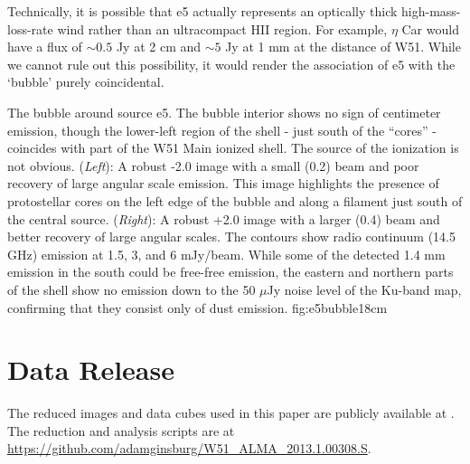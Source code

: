 \documentclass[twocolumn]{aastex61}
\begin{document}
Technically, it is possible that e5 actually represents an optically thick
high-mass-loss-rate wind rather than an ultracompact HII region. 
For example, $\eta$ Car would have a flux of $\sim0.5$ Jy at 2 cm
and $\sim5$ Jy at 1 mm at the distance of W51.  While we cannot rule out
this possibility, it would render the association of e5 with the `bubble'
purely coincidental.

{The bubble around source e5.  The bubble interior shows no sign of centimeter
emission, though the lower-left region of the shell - just south of the
``cores'' - coincides with part of the W51 Main ionized shell.  The source of
the ionization is not obvious.
({\it Left}): A robust -2.0 image with a small (0.2\arcsec) beam and poor
recovery of large angular scale emission.  This image highlights the presence
of protostellar cores on the left edge of the bubble and along a filament just
south of the central source.
({\it Right}): A robust +2.0 image with a larger (0.4\arcsec) beam and better
recovery of large angular scales.  The contours show radio continuum (14.5 GHz)
emission at 1.5, 3, and 6 mJy/beam.  While some of the detected 1.4 mm emission
in the south could be free-free emission, the eastern and northern parts of the
shell show no emission down to the 50 $\mu$Jy noise level of the Ku-band map,
confirming that they consist only of dust emission.
}{fig:e5bubble}{1}{8cm}


\section{Data Release}
The reduced images and data cubes used in this paper are publicly available at
.
The reduction and analysis scripts are at
\url{https://github.com/adamginsburg/W51_ALMA_2013.1.00308.S}.
\end{document}
